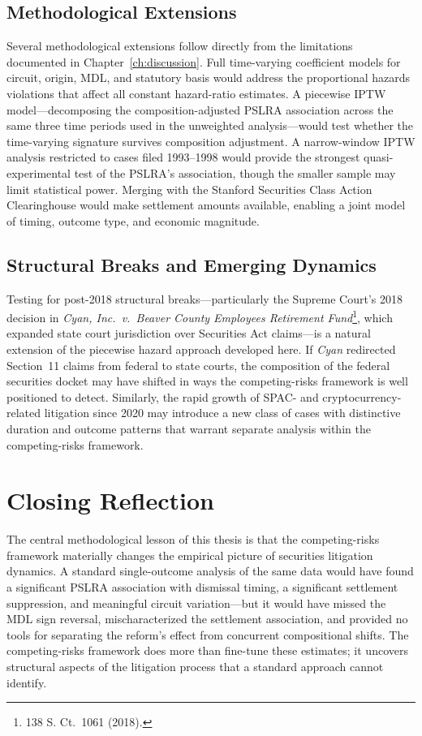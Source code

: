 \subsection{Methodological Extensions}
Several methodological extensions follow directly from the
limitations documented in Chapter~\ref{ch:discussion}. Full
time-varying coefficient models for circuit, origin, MDL, and
statutory basis would address the proportional hazards
violations that affect all constant hazard-ratio estimates. A
piecewise IPTW model---decomposing the composition-adjusted
PSLRA association across the same three time periods used in
the unweighted analysis---would test whether the time-varying
signature survives composition adjustment. A narrow-window
IPTW analysis restricted to cases filed 1993--1998 would
provide the strongest quasi-experimental test of the PSLRA's
association, though the smaller sample may limit statistical
power. Merging with the Stanford Securities Class Action
Clearinghouse would make settlement amounts available,
enabling a joint model of timing, outcome type, and economic
magnitude.

\subsection{Structural Breaks and Emerging Dynamics}
Testing for post-2018 structural breaks---particularly the
Supreme Court's 2018 decision in \textit{Cyan, Inc.\ v.\
Beaver County Employees Retirement Fund}\footnote{138 S. Ct.\
1061 (2018).}, which expanded state court jurisdiction over
Securities Act claims---is a natural extension of the
piecewise hazard approach developed here. If \textit{Cyan}
redirected Section~11 claims from federal to state courts,
the composition of the federal securities docket may have
shifted in ways the competing-risks framework is well
positioned to detect. Similarly, the rapid growth of SPAC-
and cryptocurrency-related litigation since 2020 may
introduce a new class of cases with distinctive duration and
outcome patterns that warrant separate analysis within the
competing-risks framework.

\section{Closing Reflection}

The central methodological lesson of this thesis is that the
competing-risks framework materially changes the empirical
picture of securities litigation dynamics. A standard
single-outcome analysis of the same data would have found a
significant PSLRA association with dismissal timing, a
significant settlement suppression, and meaningful circuit
variation---but it would have missed the MDL sign reversal,
mischaracterized the settlement association, and provided no
tools for separating the reform's effect from concurrent
compositional shifts. The competing-risks framework does more than fine-tune these estimates; it uncovers structural aspects of the litigation process that a standard approach cannot identify.

